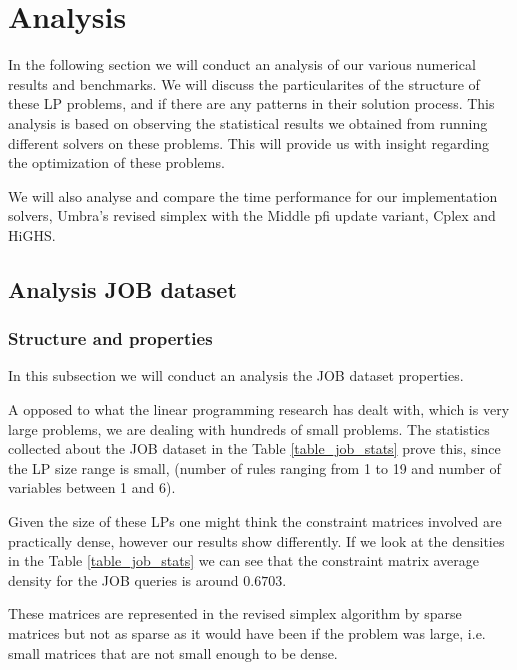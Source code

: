 \section{Analysis}
In the following section we will conduct an analysis of our various numerical results
and benchmarks.
We will discuss the
particularites of the structure of these LP problems, and if there are any
patterns in their solution
process. This analysis is based on observing the statistical results we obtained from
running different solvers on these problems. This will provide us with insight
regarding the optimization of these problems.

We will also analyse and compare the time performance for our implementation solvers,
Umbra's revised simplex with the Middle \gls{pfi} update variant, Cplex and HiGHS.


\subsection{Analysis JOB dataset}

\subsubsection{Structure and properties}
In  this subsection we will conduct an analysis the JOB dataset properties.

A opposed to what the linear programming research has dealt with, which is
very large problems, we are dealing with hundreds of small problems. The statistics
collected about the JOB dataset in the Table \ref{table_job_stats} prove this, since the LP size range is small, (number
of rules ranging from 1 to 19 and number of variables between 1 and 6).

Given the size of these LPs one might think the constraint matrices involved
are practically dense, however our results show differently. If we look at the densities
in the Table \ref{table_job_stats} we can see that the constraint matrix average density
for the JOB queries is around $0.6703$.

These matrices are represented
in the revised simplex algorithm by
sparse matrices but not as sparse as it would have been if the problem was large, i.e.
small matrices that are not small enough to be dense.

